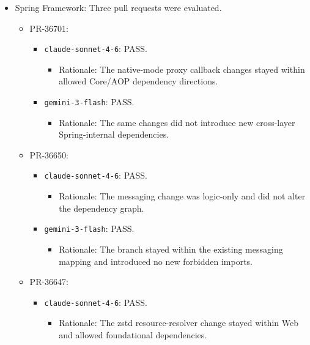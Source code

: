 \documentclass[sigconf,screen]{acmart}
\begin{document}
\begin{itemize}
    \item Spring Framework: Three pull requests were evaluated.
    \begin{itemize}
        \item PR-36701:
        \begin{itemize}
            \item \texttt{claude-sonnet-4-6}: PASS.
            \begin{itemize}
                \item Rationale: The native-mode proxy callback changes stayed within allowed Core/AOP dependency directions.
            \end{itemize}
            \item \texttt{gemini-3-flash}: PASS.
            \begin{itemize}
                \item Rationale: The same changes did not introduce new cross-layer Spring-internal dependencies.
            \end{itemize}
        \end{itemize}
        \item PR-36650:
        \begin{itemize}
            \item \texttt{claude-sonnet-4-6}: PASS.
            \begin{itemize}
                \item Rationale: The messaging change was logic-only and did not alter the dependency graph.
            \end{itemize}
            \item \texttt{gemini-3-flash}: PASS.
            \begin{itemize}
                \item Rationale: The branch stayed within the existing messaging mapping and introduced no new forbidden imports.
            \end{itemize}
        \end{itemize}
        \item PR-36647:
        \begin{itemize}
            \item \texttt{claude-sonnet-4-6}: PASS.
            \begin{itemize}
                \item Rationale: The zstd resource-resolver change stayed within Web and allowed foundational dependencies.
            \end{itemize}

\end{itemize}
\end{itemize}
\end{itemize}
\end{document}
